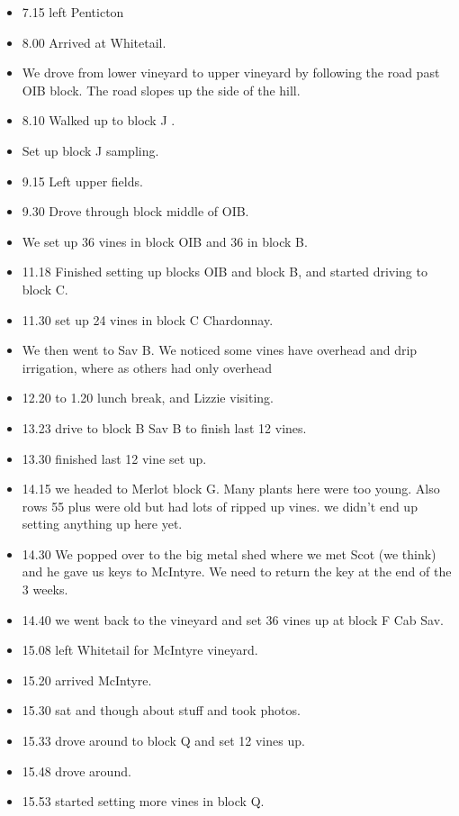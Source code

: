 \documentclass[11pt,letter]{article}
\newenvironment{smitemize}{
\begin{itemize}
  \setlength{\itemsep}{0pt}
  \setlength{\parskip}{0.8pt}
  \setlength{\parsep}{0pt}}
{\end{itemize}
}
\begin{document}
\begin{smitemize}
\subsubsection {schedule}

\item 7.15 left Penticton 
\item 8.00 Arrived at Whitetail. 
\item We drove from lower vineyard to upper vineyard by following the road past OIB block. The road slopes up the side of the hill. 
\item 8.10 Walked up to block J .
\item Set up block J sampling.
\item 9.15 Left upper fields. 
\item 9.30 Drove through block middle of OIB. 
\item We set up 36 vines in block OIB and 36 in block B.
\item 11.18 Finished setting up blocks OIB and block B, and started driving to block C. 
\item 11.30 set up 24 vines in block C Chardonnay. 
\item We then went to Sav B. We noticed some vines have overhead and drip irrigation, where as others had only overhead 
\item 12.20 to 1.20 lunch break, and Lizzie visiting.
\item 13.23  drive to block B Sav B to finish last 12 vines.
\item 13.30 finished last 12 vine set up. 
\item 14.15 we headed to Merlot block G. Many plants here were too young. Also rows 55 plus were old but had lots of ripped up vines. we didn't end up setting anything up here yet.
\item 14.30 We popped over to the big metal shed where we met Scot (we think) and he gave us keys to McIntyre. We need to return the key at the end of the 3 weeks. 
\item 14.40 we went back to the vineyard and set 36 vines up at block F Cab Sav.
\item 15.08 left Whitetail for McIntyre vineyard.
\item 15.20 arrived McIntyre.
\item 15.30 sat and though about stuff and took photos.
\item 15.33 drove around to block Q and set 12 vines up.
\item 15.48 drove around.
\item 15.53 started setting more vines in block Q.

\end{smitemize}
\end{document}
